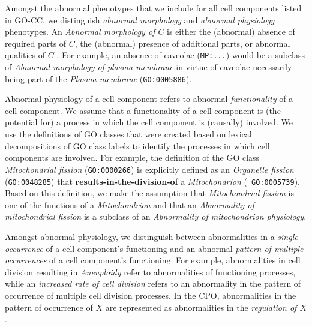 \documentclass{bioinfo}
\renewcommand{\cite}{\citep}
\begin{document}
Amongst the abnormal phenotypes that we include for all cell
components listed in GO-CC, we distinguish {\em abnormal morphology}
and {\em abnormal physiology} phenotypes. An {\em Abnormal morphology
  of $C$} is either the (abnormal) absence of required parts of $C$,
the (abnormal) presence of additional parts, or abnormal qualities of
$C$ \cite{Hoehndorf2010phene}. For example, an absence of caveolae
({\tt MP:...}) would be a subclass of {\em Abnormal morphology of
  plasma membrane} in virtue of caveolae necessarily being part of the
{\em Plasma membrane} ({\tt GO:0005886}).

Abnormal physiology of a cell component refers to abnormal {\em
  functionality} of a cell component. We assume that a functionality
of a cell component is (the potential for) a process in which the cell
component is (causally) involved. We use the definitions of GO classes
that were created based on lexical decompositions of GO class labels
\cite{Mungall2010go, Bada2007a, Ogren2004} to identify the processes
in which cell components are involved. For example, the definition of
the GO class {\em Mitochondrial fission} ({\tt GO:0000266}) is
explicitly defined as an {\em Organelle fission} ({\tt GO:0048285})
that {\bf results-in-the-division-of} a {\em Mitochondrion} ({\tt
  GO:0005739}). Based on this definition, we make the assumption that
{\em Mitochondrial fission} is one of the functions of a {\em
  Mitochondrion} and that an {\em Abnormality of mitochondrial
  fission} is a subclass of an {\em Abnormality of mitochondrion
  physiology}.

Amongst abnormal physiology, we distinguish between abnormalities in a
{\em single occurrence} of a cell component's functioning and an
abnormal {\em pattern of multiple occurrences} of a cell component's
functioning. For example, abnormalities in cell division resulting in
{\em Aneuploidy} refer to abnormalities of functioning processes,
while an {\em increased rate of cell division} refers to an
abnormality in the pattern of occurrence of multiple cell division
processes. In the CPO, abnormalities in the pattern of occurrence of
$X$ are represented as abnormalities in the {\em regulation of $X$}.
\end{document}
